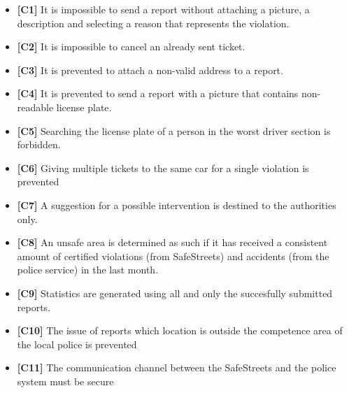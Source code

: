 \begin{itemize}
	\item \textbf{[\hypertarget{C1}{C1}]} It is impossible to send a report without attaching a picture, a description and selecting a reason that represents the violation. 
	\item \textbf{[\hypertarget{C2}{C2}]} It is impossible to cancel an already sent ticket. 
	\item \textbf{[\hypertarget{C3}{C3}]} It is prevented to attach a non-valid address to a report.
	\item \textbf{[\hypertarget{C4}{C4}]} It is prevented to send a report with a picture that contains non-readable license plate. 
	\item \textbf{[\hypertarget{C5}{C5}]} Searching the license plate of a person in the worst driver section is forbidden.
	\item \textbf{[\hypertarget{C6}{C6}]} Giving multiple tickets to the same car for a single violation is prevented
	\item \textbf{[\hypertarget{C7}{C7}]} A suggestion for a possible intervention is destined to the authorities only.
	\item \textbf{[\hypertarget{C8}{C8}]} An unsafe area is determined as such if it has received a consistent amount of certified violations (from SafeStreets) and accidents (from the police service) in the last month. 
	\item \textbf{[\hypertarget{C9}{C9}]} Statistics are generated using all and only the succesfully submitted reports.
	\item \textbf{[\hypertarget{C10}{C10}]} The issue of reports which location is outside the competence area of the local police is prevented
	\item \textbf{[\hypertarget{C11}{C11}]} The communication channel between the SafeStreets and the police system must be secure
	
\end{itemize}
\clearpage
